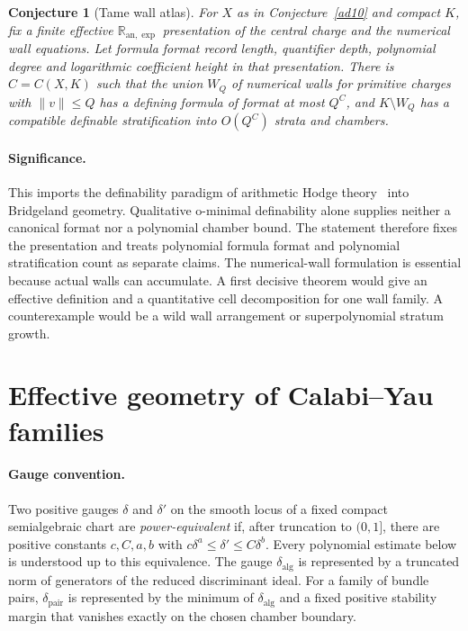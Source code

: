 \documentclass[11pt]{article}
\newtheorem{conjecture}{Conjecture}
\theoremstyle{definition}
\begin{document}
\begin{conjecture}[Tame wall atlas]\label{ad12}
For $X$ as in Conjecture~\ref{ad10} and compact $K$, fix a finite effective $\mathbb R_{\mathrm{an},\exp}$ presentation of the central charge and the numerical wall equations.  Let formula format record length, quantifier depth, polynomial degree and logarithmic coefficient height in that presentation.  There is $C=C(X,K)$ such that the union $W_Q$ of numerical walls for primitive charges with $\|v\|\le Q$ has a defining formula of format at most $Q^C$, and $K\setminus W_Q$ has a compatible definable stratification into $O(Q^C)$ strata and chambers.
\end{conjecture}

\paragraph{Significance.}
This imports the definability paradigm of arithmetic Hodge theory~\cite{BKT20} into Bridgeland geometry.  Qualitative o-minimal definability alone supplies neither a canonical format nor a polynomial chamber bound.  The statement therefore fixes the presentation and treats polynomial formula format and polynomial stratification count as separate claims.  The numerical-wall formulation is essential because actual walls can accumulate.  A first decisive theorem would give an effective definition and a quantitative cell decomposition for one wall family.  A counterexample would be a wild wall arrangement or superpolynomial stratum growth.

\section{Effective geometry of Calabi--Yau families}

\paragraph{Gauge convention.}
Two positive gauges $\delta$ and $\delta'$ on the smooth locus of a fixed compact semialgebraic chart are \emph{power-equivalent} if, after truncation to $(0,1]$, there are positive constants $c,C,a,b$ with $c\delta^a\le\delta'\le C\delta^b$.  Every polynomial estimate below is understood up to this equivalence.  The gauge $\delta_{\mathrm{alg}}$ is represented by a truncated norm of generators of the reduced discriminant ideal.  For a family of bundle pairs, $\delta_{\mathrm{pair}}$ is represented by the minimum of $\delta_{\mathrm{alg}}$ and a fixed positive stability margin that vanishes exactly on the chosen chamber boundary.
\end{document}

